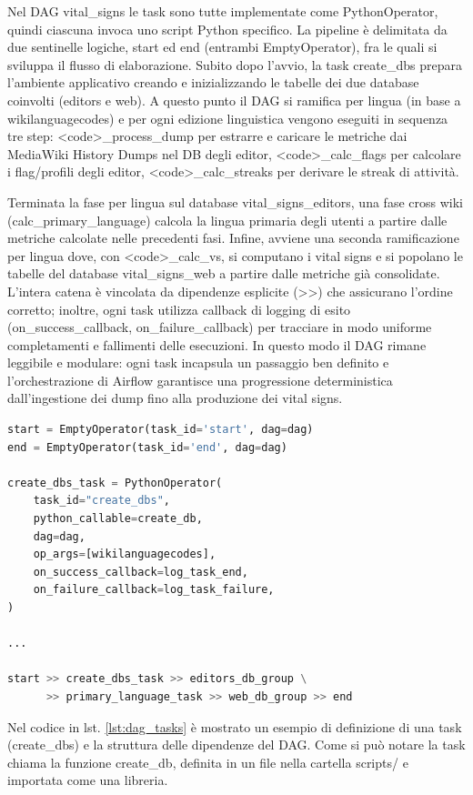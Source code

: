 Nel DAG vital\_signs le task sono tutte implementate come PythonOperator,
quindi ciascuna invoca uno script Python specifico.
La pipeline è delimitata da due sentinelle logiche, start ed end (entrambi EmptyOperator), fra le quali si sviluppa il flusso di elaborazione.
Subito dopo l’avvio, la task create\_dbs prepara l’ambiente applicativo creando e inizializzando le tabelle dei due database coinvolti (editors e web).
A questo punto il DAG si ramifica per lingua (in base a wikilanguagecodes) e per ogni edizione linguistica vengono eseguiti in sequenza tre step: 
<code>\_process\_dump per estrarre e caricare le metriche dai MediaWiki History Dumps nel DB degli editor,
<code>\_calc\_flags per calcolare i flag/profili degli editor,
<code>\_calc\_streaks per derivare le streak di attività.

Terminata la fase per lingua sul database vital\_signs\_editors, una fase cross wiki (calc\_primary\_language) calcola la lingua primaria degli utenti a partire dalle metriche calcolate nelle precedenti fasi.
Infine, avviene una seconda ramificazione per lingua dove, con <code>\_calc\_vs, si computano i vital signs e si popolano le tabelle del database  vital\_signs\_web a partire dalle metriche già consolidate.
L’intera catena è vincolata da dipendenze esplicite (>>) che assicurano l’ordine corretto; inoltre, ogni task utilizza callback di logging di esito (on\_success\_callback, on\_failure\_callback) per tracciare in modo uniforme completamenti e fallimenti delle esecuzioni.
In questo modo il DAG rimane leggibile e modulare: ogni task incapsula un passaggio ben definito e l’orchestrazione di Airflow garantisce una progressione deterministica dall’ingestione dei dump fino alla produzione dei vital signs.


\begin{lstlisting}[language=Python, caption={Esempio di definizione di una task e dipendenze del DAG}, label=lst:dag_tasks]
start = EmptyOperator(task_id='start', dag=dag)
end = EmptyOperator(task_id='end', dag=dag)

create_dbs_task = PythonOperator(
    task_id="create_dbs",
    python_callable=create_db,
    dag=dag,
    op_args=[wikilanguagecodes],
    on_success_callback=log_task_end,
    on_failure_callback=log_task_failure,
)

...

start >> create_dbs_task >> editors_db_group \
      >> primary_language_task >> web_db_group >> end
\end{lstlisting}

Nel codice in lst. \ref{lst:dag_tasks} è mostrato un esempio di definizione di una task (create\_dbs) e la struttura delle dipendenze del DAG.
Come si può notare la task chiama la funzione create\_db, definita in un file nella cartella scripts/ e importata come una libreria.


\clearpage
